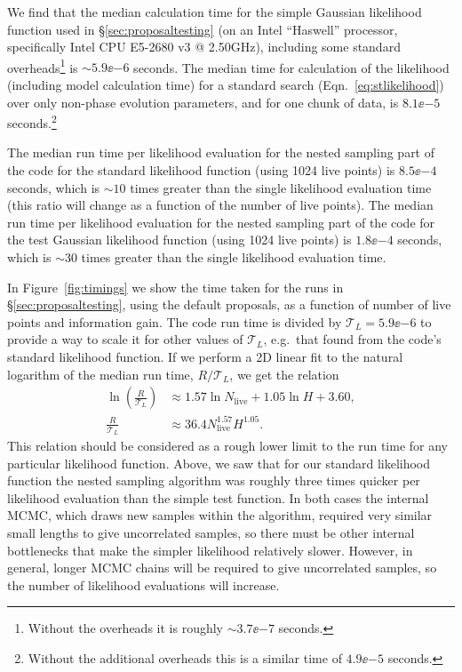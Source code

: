 We find that the median calculation time for the simple Gaussian likelihood function used in \S\ref{sec:proposaltesting} (on an Intel ``Haswell'' processor,
specifically Intel CPU E5-2680 v3 @ 2.50GHz), including some standard overheads\footnote{Without the overheads it is roughly $\sim 3.7\ee{-7}$ seconds.} is 
$\sim 5.9\ee{-6}$ seconds. The median time for calculation of the likelihood (including model calculation time) for a standard search (Eqn.~\ref{eq:stlikelihood})
over only non-phase evolution parameters, and for one chunk of data, is $8.1\ee{-5}$ seconds.\footnote{Without the additional overheads this is a similar time of
$4.9\ee{-5}$ seconds.}

The median run time per likelihood evaluation for the nested sampling part of the code for the standard likelihood function (using 1024 live points) 
is $8.5\ee{-4}$ seconds, which is $\sim 10$ times greater than the single likelihood evaluation time (this ratio will change as a function of the number
of live points). The median run time per likelihood evaluation for the nested sampling part of the code for the test Gaussian likelihood function
(using 1024 live points) is $1.8\ee{-4}$ seconds, which is $\sim 30$ times greater than the single likelihood evaluation time.

In Figure~\ref{fig:timings} we show the time taken for the runs in \S\ref{sec:proposaltesting},
using the default proposals, as a function of number of live points and information gain. The code run time is divided by $\mathcal{T}_{L}= 5.9\ee{-6}$ to
provide a way to scale it for other values of $\mathcal{T}_{L}$, e.g.\ that found from the code's standard likelihood function. If we perform a 2D linear
fit to the natural logarithm of the median run time, $R/\mathcal{T}_L$, we get the relation
\begin{align}\label{eq:runtime}
 \ln{\left(\frac{R}{\mathcal{T}_L}\right)} &\approx 1.57 \ln{N_{\text{live}}} + 1.05 \ln{H} + 3.60, \\
 \frac{R}{\mathcal{T}_L} &\approx 36.4 N_{\text{live}}^{1.57} H^{1.05}.
\end{align}
This relation should be considered as a rough lower limit to the run time for any particular likelihood function. Above, we saw that for our standard likelihood
function the nested sampling algorithm was roughly three times quicker per likelihood evaluation than the simple test function. In both cases the internal MCMC, which
draws new samples within the algorithm, required very similar small lengths to give uncorrelated samples, so there must be other internal bottlenecks that make the
simpler likelihood relatively slower. However, in general, longer MCMC chains will be required to give uncorrelated samples, so the number of likelihood evaluations
will increase.

